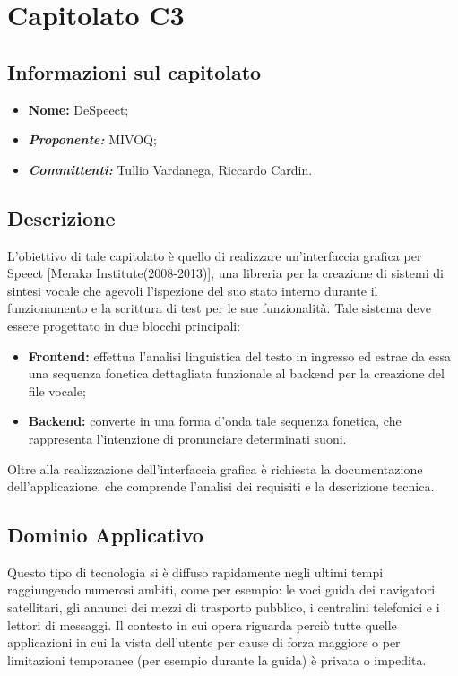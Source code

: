 \section{Capitolato C3}
\subsection{Informazioni sul capitolato}
	\begin{itemize}
		\item \textbf{Nome:}
		DeSpeect;
		\item \textbf{\textit{Proponente:}}
		MIVOQ;
		\item \textbf{\textit{Committenti:}}
		Tullio Vardanega, Riccardo Cardin.
	\end{itemize}

\subsection{Descrizione}
	L'obiettivo di tale capitolato è quello di realizzare un'interfaccia grafica per Speect [Meraka Institute(2008-2013)], una libreria per la creazione di sistemi di sintesi vocale che agevoli l’ispezione del suo stato interno durante il funzionamento e la scrittura di test per le sue funzionalità.
	\newline \newline Tale sistema deve essere progettato in due blocchi principali:
	\begin{itemize}
		\item \textbf{Frontend:}
		effettua l'analisi linguistica del testo in ingresso ed estrae da essa una sequenza fonetica dettagliata funzionale al backend per la creazione del file vocale;
		\item \textbf{Backend:}
		converte in una forma d'onda tale sequenza fonetica, che rappresenta l'intenzione di pronunciare determinati suoni.
	\end{itemize}
	Oltre alla realizzazione dell'interfaccia grafica è richiesta la documentazione dell'applicazione, che comprende l'analisi dei requisiti e la descrizione tecnica.

\subsection{Dominio Applicativo}
	 Questo tipo di tecnologia si è diffuso rapidamente negli ultimi tempi raggiungendo numerosi ambiti, come per esempio: le voci guida dei navigatori satellitari, gli annunci dei mezzi di trasporto pubblico, i centralini telefonici e i lettori di messaggi.
	 \newline \newline Il contesto in cui opera riguarda perciò tutte quelle applicazioni in cui la vista dell'utente per cause di forza maggiore o per limitazioni temporanee (per esempio durante la guida) è privata o impedita.

